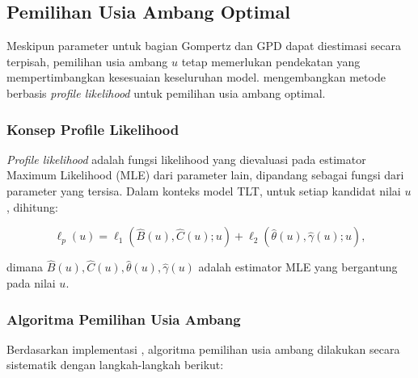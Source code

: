 \subsection{Pemilihan Usia Ambang Optimal}

Meskipun parameter untuk bagian Gompertz dan GPD dapat diestimasi secara terpisah, pemilihan usia ambang $u$ tetap memerlukan pendekatan yang mempertimbangkan kesesuaian keseluruhan model. \citet{li2008threshold} mengembangkan metode berbasis \textit{profile likelihood} untuk pemilihan usia ambang optimal.

\subsubsection{Konsep Profile Likelihood}

\textit{Profile likelihood} adalah fungsi likelihood yang dievaluasi pada estimator Maximum Likelihood (MLE) dari parameter lain, dipandang sebagai fungsi dari parameter yang tersisa. Dalam konteks model TLT, untuk setiap kandidat nilai $u$, dihitung:

\begin{equation}
\ell_p(u) = \ell_1(\hat{B}(u), \hat{C}(u); u) + \ell_2(\hat{\theta}(u), \hat{\gamma}(u); u),
\label{eq:profile_likelihood}
\end{equation}

dimana $\hat{B}(u), \hat{C}(u), \hat{\theta}(u), \hat{\gamma}(u)$ adalah estimator MLE yang bergantung pada nilai $u$.

\subsubsection{Algoritma Pemilihan Usia Ambang}

Berdasarkan implementasi \citet{li2008threshold}, algoritma pemilihan usia ambang dilakukan secara sistematik dengan langkah-langkah berikut:

